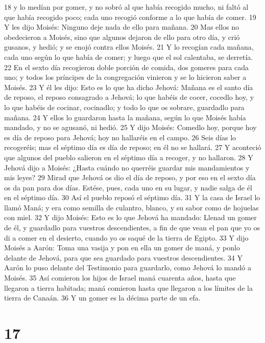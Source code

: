 18 y lo medían por gomer, y no sobró al que había recogido mucho, ni faltó al que había recogido poco; cada uno recogió conforme a lo que había de comer.
19 Y les dijo Moisés: Ninguno deje nada de ello para mañana.
20 Mas ellos no obedecieron a Moisés, sino que algunos dejaron de ello para otro día, y crió gusanos, y hedió; y se enojó contra ellos Moisés.
21 Y lo recogían cada mañana, cada uno según lo que había de comer; y luego que el sol calentaba, se derretía.
22 En el sexto día recogieron doble porción de comida, dos gomeres para cada uno; y todos los príncipes de la congregación vinieron y se lo hicieron saber a Moisés.
23 Y él les dijo: Esto es lo que ha dicho Jehová: Mañana es el santo día de reposo, el reposo consagrado a Jehová; lo que habéis de cocer, cocedlo hoy, y lo que habéis de cocinar, cocinadlo; y todo lo que os sobrare, guardadlo para mañana.
24 Y ellos lo guardaron hasta la mañana, según lo que Moisés había mandado, y no se agusanó, ni hedió.
25 Y dijo Moisés: Comedlo hoy, porque hoy es día de reposo para Jehová; hoy no hallaréis en el campo.
26 Seis días lo recogeréis; mas el séptimo día es día de reposo; en él no se hallará.
27 Y aconteció que algunos del pueblo salieron en el séptimo día a recoger, y no hallaron.
28 Y Jehová dijo a Moisés: ¿Hasta cuándo no querréis guardar mis mandamientos y mis leyes?
29 Mirad que Jehová os dio el día de reposo, y por eso en el sexto día os da pan para dos días. Estése, pues, cada uno en su lugar, y nadie salga de él en el séptimo día.
30 Así el pueblo reposó el séptimo día.
31 Y la casa de Israel lo llamó Maná; y era como semilla de culantro, blanco, y su sabor como de hojuelas con miel.
32 Y dijo Moisés: Esto es lo que Jehová ha mandado: Llenad un gomer de él, y guardadlo para vuestros descendientes, a fin de que vean el pan que yo os di a comer en el desierto, cuando yo os saqué de la tierra de Egipto.
33 Y dijo Moisés a Aarón: Toma una vasija y pon en ella un gomer de maná, y ponlo delante de Jehová, para que sea guardado para vuestros descendientes.
34 Y Aarón lo puso delante del Testimonio para guardarlo, como Jehová lo mandó a Moisés.
35 Así comieron los hijos de Israel maná cuarenta años, hasta que llegaron a tierra habitada; maná comieron hasta que llegaron a los límites de la tierra de Canaán.
36 Y un gomer es la décima parte de un efa.

\chapter{17}

